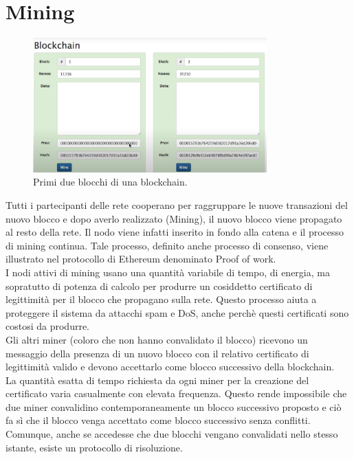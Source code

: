 \documentclass[a4paper,11pt]{report}
\begin{document}
\section{Mining}
\begin{figure}[htbp] 
\begin{center}
\includegraphics[width=9cm]{img/mm.png} 
\end{center}
\caption{Primi due blocchi di una blockchain.}
\end{figure} 
Tutti i partecipanti delle rete cooperano per raggruppare le nuove transazioni del nuovo blocco e dopo averlo realizzato (Mining), il nuovo blocco viene propagato al resto della rete. Il nodo viene infatti inserito in fondo alla catena e il processo di mining continua. Tale processo, definito anche processo di consenso, viene illustrato nel protocollo di Ethereum denominato Proof of work.\\
I nodi attivi di mining usano una quantità variabile di tempo, di energia, ma sopratutto di potenza di calcolo per produrre un cosiddetto certificato di legittimità per il blocco che propagano sulla rete. Questo processo aiuta a proteggere il sistema da attacchi spam e DoS, anche perchè questi certificati sono costosi da produrre.\\
Gli altri miner (coloro che non hanno convalidato il blocco) ricevono un messaggio della presenza di un nuovo blocco con il relativo certificato di legittimità valido e devono accettarlo come blocco successivo della blockchain.\\
La quantità esatta di tempo richiesta da ogni miner per la creazione del certificato varia casualmente con elevata frequenza. Questo rende impossibile che due miner convalidino contemporaneamente un blocco successivo proposto e ciò fa sì che il blocco venga accettato come blocco successivo senza conflitti. Comunque, anche se accedesse che due blocchi vengano convalidati nello stesso istante, esiste un protocollo di risoluzione.
\end{document}
